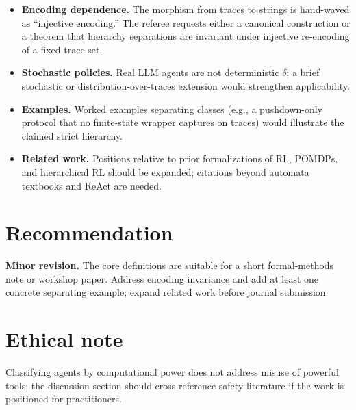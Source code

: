 \documentclass[12pt]{article}
\begin{document}
\begin{itemize}
  \item \textbf{Encoding dependence.} The morphism from traces to strings is hand-waved as ``injective encoding.'' The referee requests either a canonical construction or a theorem that hierarchy separations are invariant under injective re-encoding of a fixed trace set.
  \item \textbf{Stochastic policies.} Real LLM agents are not deterministic $\delta$; a brief stochastic or distribution-over-traces extension would strengthen applicability.
  \item \textbf{Examples.} Worked examples separating classes (e.g., a pushdown-only protocol that no finite-state wrapper captures on traces) would illustrate the claimed strict hierarchy.
  \item \textbf{Related work.} Positions relative to prior formalizations of RL, POMDPs, and hierarchical RL should be expanded; citations beyond automata textbooks and ReAct are needed.
\end{itemize}

\section*{Recommendation}

\textbf{Minor revision.} The core definitions are suitable for a short formal-methods note or workshop paper. Address encoding invariance and add at least one concrete separating example; expand related work before journal submission.

\section*{Ethical note}

Classifying agents by computational power does not address misuse of powerful tools; the discussion section should cross-reference safety literature if the work is positioned for practitioners.
\end{document}
